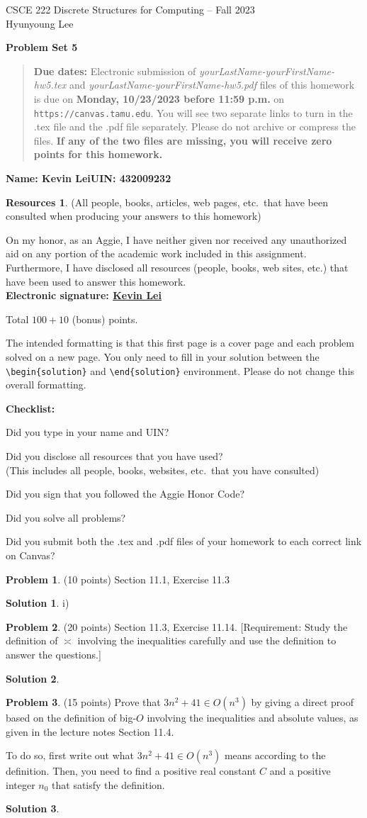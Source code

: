 \documentclass{article}
\theoremstyle{definition}
\newtheorem{problem}{Problem}
\newtheorem*{solution}{Solution}
\newtheorem*{resources}{Resources}
\newcommand{\name}[2]{\noindent\textbf{Name: #1}\hfill \textbf{UIN: #2}
  \newcommand{\myName}{#1}
  \newcommand{\myUIN}{#2}
}
\newcommand{\honor}{\noindent On my honor, as an Aggie, I have neither
  given nor received any unauthorized aid on any portion of the
  academic work included in this assignment. Furthermore, I have
  disclosed all resources (people, books, web sites, etc.) that have
  been used to answer this homework. \\[2ex]
 \textbf{Electronic signature: \underline{Kevin Lei} } } %
\newcommand{\checklist}{\noindent\textbf{Checklist:}
\begin{compactitem}[$\Box$] 
\item Did you type in your name and UIN? 
\item Did you disclose all resources that you have used? \\
(This includes all people, books, websites, etc.\ that you have consulted)
\item Did you sign that you followed the Aggie Honor Code? 
\item Did you solve all problems? 
\item Did you submit both the .tex and .pdf files of your homework to each correct link on Canvas? 
\end{compactitem}
}
\newcommand{\problemset}[1]{\begin{center}\textbf{Problem Set #1}\end{center}}
\newcommand{\duedate}[1]{\begin{quote}\textbf{Due dates:} Electronic
    submission of \textsl{yourLastName-yourFirstName-hw5.tex} and 
    \textsl{yourLastName-yourFirstName-hw5.pdf} files of this homework is due on
    \textbf{#1} on \texttt{https://canvas.tamu.edu}. You will see two separate links
    to turn in the .tex file and the .pdf file separately. Please do not archive or compress the files.  
    \textbf{If any of the two files are missing, you will receive zero points for this homework.}\end{quote} }
\begin{document}
\begin{center}
{\large
CSCE 222 Discrete Structures for Computing -- Fall 2023\\[.5ex]
Hyunyoung Lee\\}
\end{center}
\problemset{5}
\duedate{Monday, 10/23/2023 before 11:59 p.m.}
\name{Kevin Lei}{432009232} %

\begin{resources} (All people, books, articles, web pages, etc.\ that
  have been consulted when producing your answers to this homework)
\end{resources}
\honor

\bigskip

\noindent
Total $100+10$ (bonus) points.

\bigskip

\noindent
The intended formatting is that this first page is a cover page and each 
problem solved on a new page. You only need to fill in your solution between 
the \verb|\begin{solution}| and \verb|\end{solution}| environment.  
Please do not change this overall formatting.

\bigskip

\vfill
\checklist

\newpage
\begin{problem} (10 points) Section 11.1, Exercise 11.3 
\end{problem}
\begin{solution}
i)
\end{solution}

\newpage
\begin{problem} (20 points) Section 11.3, Exercise 11.14.
[Requirement: Study the definition of $\asymp$ involving the inequalities carefully 
and use the definition to answer the questions.] 
\end{problem}
\begin{solution}
\end{solution}

\newpage
\begin{problem} (15 points)
Prove that $3n^2+41 \in O(n^3)$ by giving a direct proof based on the definition of 
big-$O$ involving the inequalities and absolute values, as given in the lecture notes 
Section 11.4.  

To do so, first write out what $3n^2+41 \in O(n^3)$ means according to the definition.  
Then, you need to find a positive real constant $C$ and a positive integer $n_0$ 
that satisfy the definition.
\end{problem}
\begin{solution}
\end{solution}
\end{document}
